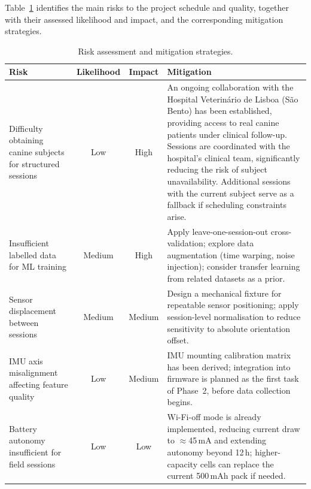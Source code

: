 Table~\ref{tab:risks} identifies the main risks to the project schedule and
quality, together with their assessed likelihood and impact, and the
corresponding mitigation strategies.

\begin{table}[ht]
  \centering
  \caption{Risk assessment and mitigation strategies.}
  \label{tab:risks}
  \begin{tabular}{p{3.6cm} c c p{6.0cm}}
    \toprule
    \textbf{Risk} & \textbf{Likelihood} & \textbf{Impact} & \textbf{Mitigation} \\
    \midrule
    Difficulty obtaining canine subjects for structured sessions
    & Low & High
    & An ongoing collaboration with the Hospital Veterinário de Lisboa
      (São Bento) has been established, providing access to real canine
      patients under clinical follow-up. Sessions are coordinated with the
      hospital's clinical team, significantly reducing the risk of subject
      unavailability. Additional sessions with the current subject serve as
      a fallback if scheduling constraints arise. \\
    \addlinespace
    Insufficient labelled data for ML training
    & Medium & High
    & Apply leave-one-session-out cross-validation; explore data
      augmentation (time warping, noise injection); consider
      transfer learning from related datasets as a prior. \\
    \addlinespace
    Sensor displacement between sessions
    & Medium & Medium
    & Design a mechanical fixture for repeatable sensor positioning;
      apply session-level normalisation to reduce sensitivity to
      absolute orientation offset. \\
    \addlinespace
    IMU axis misalignment affecting feature quality
    & Low & Medium
    & IMU mounting calibration matrix has been derived;
      integration into firmware is planned as the first task
      of Phase~2, before data collection begins. \\
    \addlinespace
    Battery autonomy insufficient for field sessions
    & Low & Low
    & Wi-Fi-off mode is already implemented, reducing current draw
      to $\approx$45\,mA and extending autonomy beyond 12\,h;
      higher-capacity cells can replace the current 500\,mAh pack
      if needed. \\
    \bottomrule
  \end{tabular}
\end{table}
